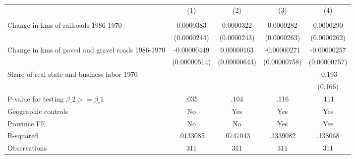 {
\def\sym#1{\ifmmode^{#1}\else\(^{#1}\)\fi}
\begin{tabular}{l*{4}{c}}
\hline\hline
                &\multicolumn{1}{c}{(1)}&\multicolumn{1}{c}{(2)}&\multicolumn{1}{c}{(3)}&\multicolumn{1}{c}{(4)}\\
                &\multicolumn{1}{c}{}&\multicolumn{1}{c}{}&\multicolumn{1}{c}{}&\multicolumn{1}{c}{}\\
\hline
Change in kms of railroads 1986-1970&0.0000383         &0.0000322         &0.0000282         &0.0000290         \\
                &(0.0000244)         &(0.0000243)         &(0.0000263)         &(0.0000262)         \\
[1em]
Change in kms of paved and gravel roads 1986-1970&-0.00000449         &0.00000163         &-0.00000271         &-0.00000257         \\
                &(0.00000514)         &(0.00000644)         &(0.00000758)         &(0.00000757)         \\
[1em]
Share of real state and business labor 1970&                  &                  &                  &   -0.193         \\
                &                  &                  &                  &  (0.166)         \\
\hline
P-value for testing $\beta\_{2} >= \beta\_{1}$&     .035         &     .104         &     .116         &     .111         \\
Geographic controls&       No         &      Yes         &      Yes         &      Yes         \\
Province FE     &       No         &       No         &      Yes         &      Yes         \\
R-squared       & .0133085         & .0747043         & .1339082         &  .138068         \\
Observations    &      311         &      311         &      311         &      311         \\
\hline\hline
\end{tabular}
}
